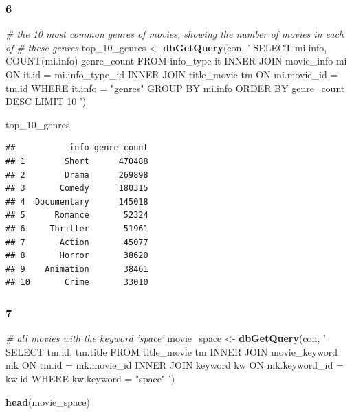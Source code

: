 \documentclass[]{article}
\newenvironment{Shaded}{\begin{snugshade}}{\end{snugshade}}
\newcommand{\KeywordTok}[1]{\textcolor[rgb]{0.13,0.29,0.53}{\textbf{{#1}}}}
\newcommand{\StringTok}[1]{\textcolor[rgb]{0.31,0.60,0.02}{{#1}}}
\newcommand{\CommentTok}[1]{\textcolor[rgb]{0.56,0.35,0.01}{\textit{{#1}}}}
\newcommand{\NormalTok}[1]{{#1}}
\begin{document}
\subsubsection{6}\label{section}

\begin{Shaded}
\begin{Highlighting}[]
\CommentTok{# the 10 most common genres of movies, showing the number of movies in each of }
\CommentTok{# these genres}
\NormalTok{top_10_genres <-}\StringTok{ }
\StringTok{  }\KeywordTok{dbGetQuery}\NormalTok{(con, }\StringTok{'}
\StringTok{             SELECT mi.info, COUNT(mi.info) genre_count}
\StringTok{             FROM info_type it INNER JOIN movie_info mi ON it.id = mi.info_type_id}
\StringTok{                INNER JOIN title_movie tm ON mi.movie_id = tm.id}
\StringTok{             WHERE it.info = "genres"}
\StringTok{             GROUP BY mi.info}
\StringTok{             ORDER BY genre_count DESC}
\StringTok{             LIMIT 10}
\StringTok{             '}\NormalTok{)}

\NormalTok{top_10_genres}
\end{Highlighting}
\end{Shaded}

\begin{verbatim}
##           info genre_count
## 1        Short      470488
## 2        Drama      269898
## 3       Comedy      180315
## 4  Documentary      145018
## 5      Romance       52324
## 6     Thriller       51961
## 7       Action       45077
## 8       Horror       38620
## 9    Animation       38461
## 10       Crime       33010
\end{verbatim}

\subsubsection{7}\label{section-1}

\begin{Shaded}
\begin{Highlighting}[]
\CommentTok{# all movies with the keyword 'space'}
\NormalTok{movie_space <-}
\StringTok{  }\KeywordTok{dbGetQuery}\NormalTok{(con, }\StringTok{'}
\StringTok{             SELECT tm.id, tm.title}
\StringTok{             FROM title_movie tm INNER JOIN movie_keyword mk ON tm.id = mk.movie_id}
\StringTok{                INNER JOIN keyword kw ON mk.keyword_id = kw.id}
\StringTok{             WHERE kw.keyword = "space"}
\StringTok{             '}\NormalTok{)}

\KeywordTok{head}\NormalTok{(movie_space)}
\end{Highlighting}
\end{Shaded}
\end{document}
